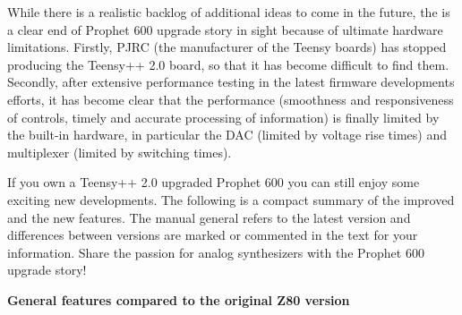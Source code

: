 \documentclass[landscape, 11pt, oneside]{report}
\newenvironment{flowtext}{\addmargin[0cm]{7cm}}{\endaddmargin} %
\begin{document}
\begin{flowtext}
While there is a realistic backlog of additional ideas to come in the future, the is a clear end of Prophet 600 upgrade story in sight because of ultimate hardware limitations. Firstly, PJRC (the manufacturer of the Teensy boards) has stopped producing the Teensy++ 2.0 board, so that it has become difficult to find them. Secondly, after extensive performance testing in the latest firmware developments efforts, it has become clear that the performance (smoothness and responsiveness of controls, timely and accurate processing of information) is finally limited by the built-in hardware, in particular the DAC (limited by voltage rise times) and multiplexer (limited by switching times). 

If you own a Teensy++ 2.0 upgraded Prophet 600 you can still enjoy some exciting new developments. The following is a compact summary of the improved and the new features. The manual general refers to the latest version \version and differences between versions are marked or commented in the text for your information. Share the passion for analog synthesizers with the Prophet 600 upgrade story!  

\textbf{General features compared to the original Z80 version}
  

\end{flowtext}
\end{document}

